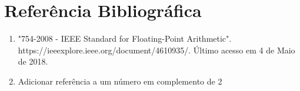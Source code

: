 \documentclass[12pt, a4paper, twoside]{article}
\begin{document}

\section{Referência Bibliográfica}

\begin{enumerate}
    \item "754-2008 - IEEE Standard for Floating-Point Arithmetic". https://ieeexplore.ieee.org/document/4610935/. Último acesso em 4 de Maio de 2018.
    \item Adicionar referência a um número em complemento de 2 %
\end{enumerate}
\end{document}
